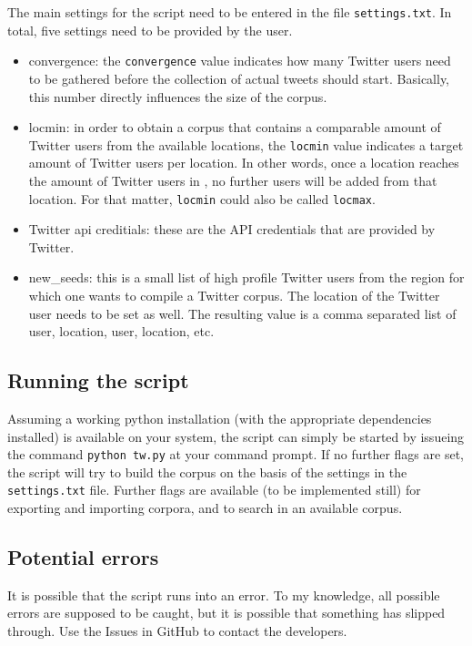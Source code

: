 \documentclass[a4paper,10pt]{article}
\begin{document}
The main settings for the script need to be entered in the file \texttt{settings.txt}. In total, five settings need to be provided by the user.

\begin{itemize}
  \item convergence: the \texttt{convergence} value indicates how many Twitter users need to be gathered before the collection of actual tweets should start. Basically, this number directly influences the size of the corpus.
  \item locmin: in order to obtain a corpus that contains a comparable amount of Twitter users from the available locations, the \texttt{locmin} value indicates a target amount of Twitter users per location. In other words, once a location reaches the amount of Twitter users in , no further users will be added from that location. For that matter, \texttt{locmin} could also be called \texttt{locmax}.
  \item Twitter api creditials: these are the API credentials that are provided by Twitter.
  \item new\_seeds: this is a small list of high profile Twitter users from the region for which one wants to compile a Twitter corpus. The location of the Twitter user needs to be set as well. The resulting value is a comma separated list of user, location, user, location, etc.
\end{itemize}

\subsection{Running the script}

Assuming a working python installation (with the appropriate dependencies installed) is available on your system, the script can simply be started by issueing the command \texttt{python tw.py} at your command prompt. If no further flags are set, the script will try to build the corpus on the basis of the settings in the \texttt{settings.txt} file. Further flags are available (to be implemented still) for exporting and importing corpora, and to search in an available corpus.

\subsection{Potential errors}

It is possible that the script runs into an error. To my knowledge, all possible errors are supposed to be caught, but it is possible that something has slipped through. Use the Issues in GitHub to contact the developers.
\end{document}
